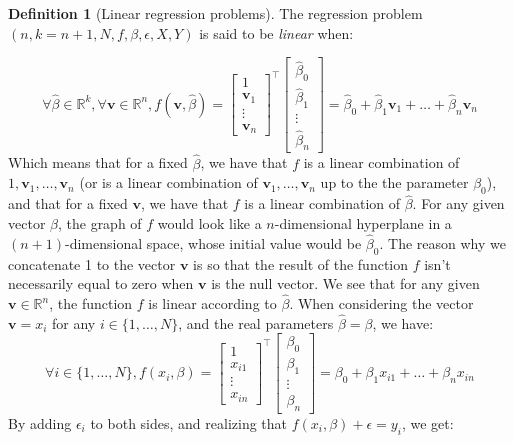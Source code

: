 \documentclass{article}
\theoremstyle{definition}
\newtheorem{definition}{Definition}[section]
\theoremstyle{remark}
\theoremstyle{example}
\newcommand{\vv}{\mathbf{v}}
\newcommand{\betat}{\hat{\beta}}
\begin{document}
\begin{definition}[Linear regression problems]
		The regression problem $(n, k=n+1, N, f, \beta, \epsilon, X, Y)$ is said to be \textit{linear} when:

		\begin{equation} \label{eqn1}
				\forall \betat \in \mathbb{R}^k, \forall \vv \in \mathbb{R}^n, f(\vv, \betat) = \begin{bmatrix} 1 \\ \vv_1 \\ \vdots \\ \vv_n \end{bmatrix}^\top \begin{bmatrix} \betat_0 \\ \betat_1 \\ \vdots \\ \betat_n \end{bmatrix} = \betat_0 + \betat_1 \vv_1 + \dots + \betat_n \vv_n
		\end{equation}
		Which means that for a fixed $\betat$, we have that $f$ is a linear combination of $1, \vv_1, \dots, \vv_n$ (or is a linear combination of $\vv_1, \dots, \vv_n$ up to the the parameter $\beta_0$), and that for a fixed $\vv$, we have that $f$ is a linear combination of $\betat$. For any given vector $\betat$, the graph of $f$ would look like a $n$-dimensional hyperplane in a $(n+1)$-dimensional space, whose initial value would be $\betat_0$. The reason why we concatenate 1 to the vector $\vv$ is so that the result of the function $f$ isn't necessarily equal to zero when $\vv$ is the null vector. We see that for any given $\vv \in \mathbb{R}^n$, the function $f$ is linear according to $\betat$. When considering the vector $\vv = x_i$ for any $i \in \{1, \dots, N\}$, and the real parameters $\betat = \beta$, we have:
				$$\forall i \in \{1, \dots, N\}, f(x_i, \beta) = \begin{bmatrix} 1 \\ x_{i1} \\ \vdots \\ x_{in} \end{bmatrix}^\top \begin{bmatrix} \beta_0 \\ \beta_1 \\ \vdots \\ \beta_n \end{bmatrix} = \beta_0 + \beta_1 x_{i1} + \dots + \beta_n x_{in}$$
		By adding $\epsilon_i$ to both sides, and realizing that $f(x_i, \beta) + \epsilon = y_i$, we get:

\end{definition}
\end{document}

